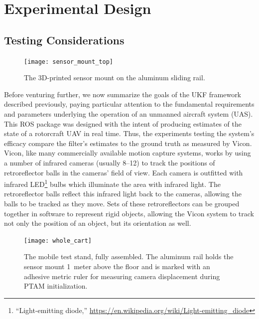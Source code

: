 \chapter{Experimental Design} \label{ch:Exp_Design}

\section{Testing Considerations}

\begin{figure}
        \centering
        \texttt{[image: sensor\_mount\_top]}
        \caption[Sensor Mount Top View]{The 3D-printed sensor mount on the aluminum sliding rail.}
        \label{fig:sensor_mount_top}
\end{figure}

Before venturing further, we now summarize the goals of the UKF framework described previously, paying particular attention to the fundamental requirements and parameters underlying the operation of an unmanned aircraft system (UAS). This ROS package was designed with the intent of producing estimates of the state of a rotorcraft UAV in real time. Thus, the experiments testing the system's efficacy compare the filter's estimates to the ground truth as measured by Vicon. Vicon, like many commercially available motion capture systems, works by using a number of infrared cameras (usually 8--12) to track the positions of retroreflector balls in the cameras' field of view. Each camera is outfitted with infrared LED\footnote{``Light-emitting diode,'' \url{https://en.wikipedia.org/wiki/Light-emitting_diode}} bulbs which illuminate the area with infrared light. The retroreflector balls reflect this infrared light back to the cameras, allowing the balls to be tracked as they move. Sets of these retroreflectors can be grouped together in software to represent rigid objects, allowing the Vicon system to track not only the position of an object, but its orientation as well.

\begin{figure}
  \centering
    \texttt{[image: whole\_cart]}
  \caption[Mobile Test Stand]{The mobile test stand, fully assembled. The aluminum rail holds the sensor mount 1~meter above the floor and is marked with an adhesive metric ruler for measuring camera displacement during PTAM initialization.}
  \label{fig:whole_cart}
\end{figure}

